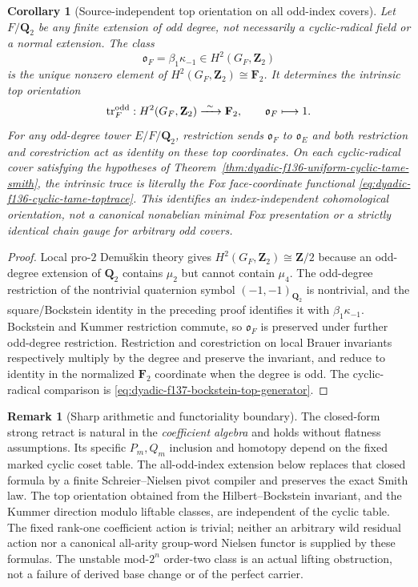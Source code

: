 \documentclass[11pt]{article}
\newtheorem{corollary}[theorem]{Corollary}
\theoremstyle{definition}
\newtheorem{remark}[theorem]{Remark}
\begin{document}
\begin{corollary}[Source-independent top orientation on all odd-index covers]
\label{cor:dyadic-f137-odd-cover-top-orientation}
Let $F/\mathbf Q_2$ be \emph{any} finite extension
of odd degree, not necessarily a cyclic-radical
field or a normal extension.  The class
\[
\mathfrak o_F=\beta_1\kappa_{-1}
\in H^2(G_F,\mathbf Z_2)
\]
is the unique nonzero element of
$H^2(G_F,\mathbf Z_2)\cong\mathbf F_2$.
It determines the intrinsic top orientation
\[
\operatorname{tr}^{\rm odd}_F:
H^2(G_F,\mathbf Z_2)\xrightarrow{\ \sim\ }\mathbf F_2,
\qquad
\mathfrak o_F\longmapsto1.
\]
For any odd-degree tower $E/F/\mathbf Q_2$,
restriction sends $\mathfrak o_F$
to $\mathfrak o_E$ and both restriction
and corestriction act as identity on
these top coordinates.  On each cyclic-radical
cover satisfying the hypotheses of
Theorem~\ref{thm:dyadic-f136-uniform-cyclic-tame-smith},
the intrinsic trace is \emph{literally}
the Fox face-coordinate functional
\eqref{eq:dyadic-f136-cyclic-tame-toptrace}.
This identifies an index-independent
\emph{cohomological orientation}, not
a canonical nonabelian minimal Fox
presentation or a strictly identical
chain gauge for arbitrary odd covers.
\end{corollary}

\begin{proof}
Local pro-$2$ Demu\v{s}kin theory gives
$H^2(G_F,\mathbf Z_2)\cong\mathbf Z/2$
because an odd-degree extension of
$\mathbf Q_2$ contains $\mu_2$
but cannot contain $\mu_4$.
The odd-degree restriction of the
nontrivial quaternion symbol
$(-1,-1)_{\mathbf Q_2}$
is nontrivial, and the square/Bockstein
identity in the preceding proof identifies
it with $\beta_1\kappa_{-1}$.
Bockstein and Kummer restriction commute,
so $\mathfrak o_F$ is preserved under
further odd-degree restriction.
Restriction and corestriction on
local Brauer invariants respectively
multiply by the degree and preserve
the invariant, and reduce to identity
in the normalized $\mathbf F_2$
coordinate when the degree is odd.
The cyclic-radical comparison is
\eqref{eq:dyadic-f137-bockstein-top-generator}.
\end{proof}

\begin{remark}[Sharp arithmetic and functoriality boundary]
\label{rem:dyadic-f137-scope}
The closed-form strong retract is natural in the
\emph{coefficient algebra} and holds
without flatness assumptions.  Its
specific $P_m,Q_m$ inclusion and homotopy depend
on the fixed marked cyclic coset table.
The all-odd-index extension below replaces that
closed formula by a finite Schreier--Nielsen
pivot compiler and preserves the exact Smith law.
The top orientation obtained from
the Hilbert--Bockstein invariant, and the
Kummer direction modulo liftable classes, are
independent of the cyclic table.  The fixed
rank-one coefficient action is trivial;
neither an arbitrary wild residual action
nor a canonical all-arity group-word
Nielsen functor is supplied by these
formulas.  The unstable mod-$2^n$
order-two class is an actual lifting
obstruction, not a failure of derived
base change or of the perfect carrier.
\end{remark}
\end{document}
